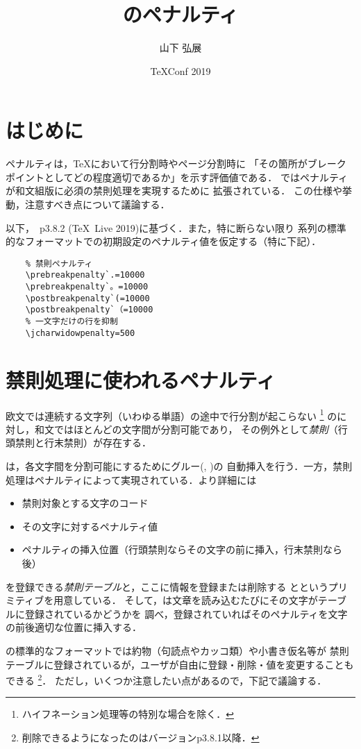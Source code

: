 \documentclass[paper=a4,twocolumn,line_length=24zw,number_of_lines=43]{jlreq}
\title{\pTeX のペナルティ}
\author{山下 弘展}
\date{\TeX Conf 2019}
\begin{document}
\maketitle

\section{はじめに}
ペナルティは，\TeX において行分割時やページ分割時に
「その箇所がブレークポイントとしてどの程度適切であるか」を示す評価値である．
\pTeX ではペナルティが和文組版に必須の禁則処理を実現するために
拡張されている\cite{ptex-manual}．
この仕様や挙動，注意すべき点について議論する．

以下，\pTeX~p3.8.2 (\TeX\ Live 2019)に基づく．また，特に断らない限り
\pTeX 系列の標準的なフォーマットでの初期設定のペナルティ値を仮定する（特に下記）．
\begin{verbatim}
    % 禁則ペナルティ
    \prebreakpenalty`.=10000
    \prebreakpenalty`。=10000
    \postbreakpenalty`(=10000
    \postbreakpenalty`（=10000
    % 一文字だけの行を抑制
    \jcharwidowpenalty=500
\end{verbatim}


\section{禁則処理に使われるペナルティ}

欧文では連続する文字列（いわゆる単語）の途中で行分割が起こらない
\footnote{ハイフネーション処理等の特別な場合を除く．}
のに対し，和文ではほとんどの文字間が分割可能であり，
その例外として\emph{禁則}（行頭禁則と行末禁則）が存在する．

\pTeX は，各文字間を分割可能にするためにグルー(, )の
自動挿入を行う．一方，禁則処理はペナルティによって実現されている．より詳細には
\begin{itemize}
  \item 禁則対象とする文字のコード
  \item その文字に対するペナルティ値
  \item ペナルティの挿入位置（行頭禁則ならその文字の前に挿入，行末禁則なら後）
\end{itemize}
を登録できる\emph{禁則テーブル}と，ここに情報を登録または削除する
とというプリミティブを用意している．
そして，\pTeX は文章を読み込むたびにその文字がテーブルに登録されているかどうかを
調べ，登録されていればそのペナルティを文字の前後適切な位置に挿入する．

\pTeX の標準的なフォーマットでは約物（句読点やカッコ類）や小書き仮名等が
禁則テーブルに登録されているが，ユーザが自由に登録・削除・値を変更することもできる
\footnote{削除できるようになったのはバージョンp3.8.1以降\cite{build26, build57}．}．
ただし，いくつか注意したい点があるので，下記で議論する．
\end{document}

